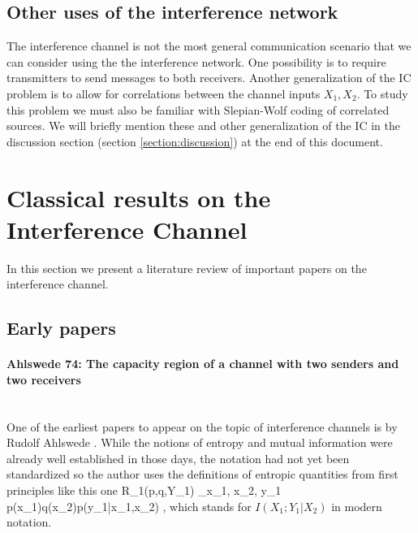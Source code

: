 \documentclass[aps,11pt,twoside,letterpaper]{article}
\begin{document}
    \subsection{Other uses of the interference network}

        The interference channel is not the most general communication scenario
        that we can consider using the the interference network.
        One possibility is to require transmitters to send messages to both
        receivers.
        Another generalization %
        of the IC problem is to allow for correlations between the channel inputs $X_1,X_2$.
        To study this problem we must also be familiar with Slepian-Wolf
        coding of correlated sources. 
        We will briefly mention these and other generalization of the IC in the discussion
        section (section  \ref{section:discussion}) at the end of this document.

        




\section{Classical results on the Interference Channel}   \label{section:lit-review}

    
    In this section we present a literature review of important papers 
    on the interference channel.
    

    \subsection{Early papers}


        \paragraph{Ahlswede 74: The capacity region of a channel with two senders and two receivers} \ \\
        
            One of the earliest papers to appear on the topic of interference channels is by Rudolf Ahlswede \cite{Ahlswede1974}.
            While the notions of entropy and mutual information were already well established in those days, 
            the notation had not yet been standardized so the author uses the definitions of entropic 
            quantities from first principles like this one
            \be
                R_1(p,q,Y_1) \triangleq
                    \sum_{x_1, x_2, y_1} 
                        p(x_1)q(x_2)p(y_1|x_1,x_2) 
                        \log {},
            \ee
            which stands for $I(X_1;Y_1|X_2)$ in modern notation.
\end{document}
